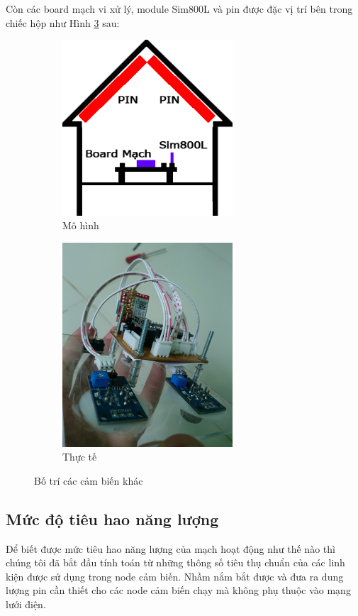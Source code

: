 Còn các board mạch vi xử lý, module Sim800L và pin được đặc vị trí bên trong chiếc hộp như Hình \ref{fig:botrikhac} sau:
\begin{figure}[H]
	\centering  
	\begin{subfigure}[b]{0.5\textwidth}
		\includegraphics[width=2.5in]{house_board_kogps}
		\caption[Mô hình]{Mô hình}
		\label{fig:house_board_kogps}
	\end{subfigure}\hfill
	\begin{subfigure}[b]{0.5\textwidth}
		\includegraphics[width=2.5in]{pic1}
		\caption[Thực tế]{Thực tế}
		\label{fig:pic1}
	\end{subfigure}
	\caption{Bố trí các cảm biến khác}\label{fig:botrikhac}
\end{figure}

















\subsection{Mức độ tiêu hao năng lượng}
Để biết được mức tiêu hao năng lượng của mạch hoạt động như thế nào thì chúng tôi đã bắt đầu tính toán từ những thông số tiêu thụ chuẩn của các linh kiện được sử dụng trong node cảm biến. Nhầm nắm bắt được và đưa ra dung lượng pin cần thiết cho các node cảm biến chạy mà không phụ thuộc vào mạng lưới điện.

